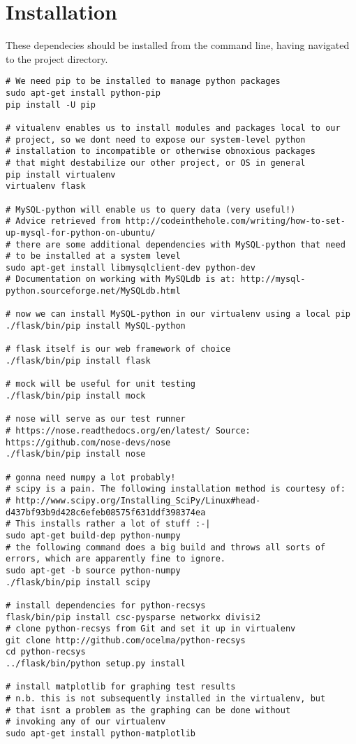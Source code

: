 \appendix
\scriptsize

\section{Installation} \label{app:installation}

These dependecies should be installed from the command line, having navigated to the project directory.

\begin{verbatim}
# We need pip to be installed to manage python packages
sudo apt-get install python-pip
pip install -U pip

# vitualenv enables us to install modules and packages local to our
# project, so we dont need to expose our system-level python
# installation to incompatible or otherwise obnoxious packages
# that might destabilize our other project, or OS in general
pip install virtualenv
virtualenv flask

# MySQL-python will enable us to query data (very useful!)
# Advice retrieved from http://codeinthehole.com/writing/how-to-set-up-mysql-for-python-on-ubuntu/
# there are some additional dependencies with MySQL-python that need
# to be installed at a system level
sudo apt-get install libmysqlclient-dev python-dev
# Documentation on working with MySQLdb is at: http://mysql-python.sourceforge.net/MySQLdb.html

# now we can install MySQL-python in our virtualenv using a local pip
./flask/bin/pip install MySQL-python

# flask itself is our web framework of choice
./flask/bin/pip install flask

# mock will be useful for unit testing
./flask/bin/pip install mock

# nose will serve as our test runner
# https://nose.readthedocs.org/en/latest/ Source: https://github.com/nose-devs/nose
./flask/bin/pip install nose

# gonna need numpy a lot probably!
# scipy is a pain. The following installation method is courtesy of:
# http://www.scipy.org/Installing_SciPy/Linux#head-d437bf93b9d428c6efeb08575f631ddf398374ea
# This installs rather a lot of stuff :-|
sudo apt-get build-dep python-numpy 
# the following command does a big build and throws all sorts of errors, which are apparently fine to ignore.
sudo apt-get -b source python-numpy 
./flask/bin/pip install scipy 

# install dependencies for python-recsys
flask/bin/pip install csc-pysparse networkx divisi2
# clone python-recsys from Git and set it up in virtualenv
git clone http://github.com/ocelma/python-recsys
cd python-recsys
../flask/bin/python setup.py install

# install matplotlib for graphing test results
# n.b. this is not subsequently installed in the virtualenv, but
# that isnt a problem as the graphing can be done without
# invoking any of our virtualenv
sudo apt-get install python-matplotlib
\end{verbatim}

